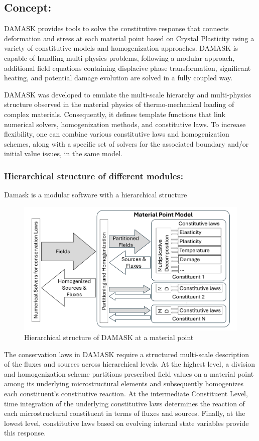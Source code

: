 \subsection{Concept:}
DAMASK provides tools to solve the constitutive response that connects deformation and stress at each material point based on Crystal Plasticity using a variety of constitutive models and homogenization approaches. DAMASK is capable of handling multi-physics problems, following a modular approach, additional field equations containing displacive phase transformation, significant heating, and potential damage evolution are solved in a fully coupled way. 

DAMASK was developed to emulate the multi-scale hierarchy and multi-physics structure observed in the material physics of thermo-mechanical loading of complex materials. Consequently, it defines template functions that link numerical solvers, homogenization methods, and constitutive laws. To increase flexibility, one can combine various constitutive laws and homogenization schemes, along with a specific set of solvers for the associated boundary and/or initial value issues, in the same model.
\subsubsection{Hierarchical structure of different modules:}
Damask is a modular software with a hierarchical structure
\begin{figure}[H]
    \centering
    \includegraphics[width=\textwidth]{images/Hierarchical structure of DAMASK at a material point.pdf}
    \caption{Hierarchical structure of DAMASK at a material point}
    \label{DAMASK_hierarchy}
\end{figure}


The conservation laws in DAMASK require a structured multi-scale description of the fluxes and sources across hierarchical levels. At the highest level, a division and homogenization scheme partitions prescribed field values on a material point among its underlying microstructural elements and subsequently homogenizes each constituent's constitutive reaction. At the intermediate Constituent Level, time integration of the underlying constitutive laws determines the reaction of each microstructural constituent in terms of fluxes and sources. Finally, at the lowest level, constitutive laws based on evolving internal state variables provide this response.
